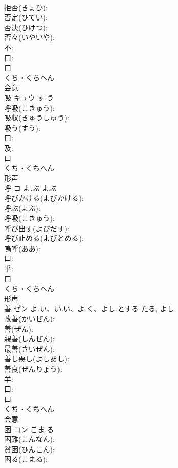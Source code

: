 \documentclass[8pt]{extreport}
\begin{document}
\begin{CJK}{UTF8}{min}
\\	拒否(きょひ): 
\\	否定(ひてい): 
\\	否決(ひけつ): 
\\	否々(いやいや): 
\\	不: 
\\	口: 
\\	口	
\\	くち・くちへん	
\\	会意 
\\	吸	キュウ	す.う		
\\	呼吸(こきゅう): 
\\	吸収(きゅうしゅう): 
\\	吸う(すう): 
\\	口: 
\\	及: 
\\	口	
\\	くち・くちへん	
\\	形声 
\\	呼	コ	よ.ぶ	よぶ	
\\	呼びかける(よびかける): 
\\	呼ぶ(よぶ): 
\\	呼吸(こきゅう): 
\\	呼び出す(よびだす): 
\\	呼び止める(よびとめる): 
\\	嗚呼(ああ): 
\\	口: 
\\	乎: 
\\	口	
\\	くち・くちへん	
\\	形声 
\\	善	ゼン	よ.い、い.い、よ.く、よし.とする	たる, よし	
\\	改善(かいぜん): 
\\	善(ぜん): 
\\	親善(しんぜん): 
\\	最善(さいぜん): 
\\	善し悪し(よしあし): 
\\	善良(ぜんりょう): 
\\	羊: 
\\	口: 
\\	口	
\\	くち・くちへん	
\\	会意 
\\	困	コン	こま.る		
\\	困難(こんなん): 
\\	貧困(ひんこん): 
\\	困る(こまる): 

\end{CJK}
\end{document}
